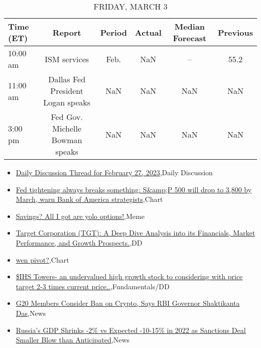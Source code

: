 \documentclass{article}%
\begin{document}
\begin{table}[htbp]%
\caption{FRIDAY, MARCH 3}%
\centering%
\begin{adjustbox}{width=1\textwidth}%
\begin{tabular}{lccccc}
\toprule
Time (ET) &                            Report & Period & Actual & Median Forecast & Previous \\
\midrule
 10:00 am &                      ISM services &   Feb. &    NaN &              -- &     55.2 \\
 11:00 am & Dallas Fed President Logan speaks &    NaN &    NaN &             NaN &      NaN \\
  3:00 pm &   Fed Gov. Michelle Bowman speaks &    NaN &    NaN &             NaN &      NaN \\
\bottomrule
\end{tabular}
%
\end{adjustbox}%
\end{table}

%
\begin{itemize}%
\item%
\href{https://reddit.com/r/wallstreetbets/comments/11d95qb/daily\_discussion\_thread\_for\_february\_27\_2023/}{Daily Discussion Thread for February 27, 2023},Daily Discussion%
\item%
\href{https://reddit.com/r/wallstreetbets/comments/11d91pj/fed\_tightening\_always\_breaks\_something\_sp\_500/}{Fed tightening always breaks something: S\&amp;P 500 will drop to 3,800 by March, warn Bank of America strategists},Chart%
\item%
\href{https://reddit.com/r/wallstreetbets/comments/11d7mxk/savings\_all\_i\_got\_are\_yolo\_options/}{Savings? All I got are yolo options!},Meme%
\item%
\href{https://reddit.com/r/wallstreetbets/comments/11d6a3s/target\_corporation\_tgt\_a\_deep\_dive\_analysis\_into/}{Target Corporation (TGT): A Deep Dive Analysis into its Financials, Market Performance, and Growth Prospects.},DD%
\item%
\href{https://reddit.com/r/wallstreetbets/comments/11d5p6j/wen\_pivot/}{wen pivot?},Chart%
\item%
\href{https://reddit.com/r/StockMarket/comments/11d2taj/ihs\_towers\_an\_undervalued\_high\_growth\_stock\_to/}{\$IHS Towers- an undervalued high growth stock to considering with price target 2-3 times current price..},Fundamentals/DD%
\item%
\href{https://reddit.com/r/Economics/comments/11d2xv1/g20\_members\_consider\_ban\_on\_crypto\_says\_rbi/}{G20 Members Consider Ban on Crypto, Says RBI Governor Shaktikanta Das},News%
\item%
\href{https://reddit.com/r/Economics/comments/11czvib/russias\_gdp\_shrinks\_2\_vs\_expected\_1015\_in\_2022\_as/}{Russia's GDP Shrinks -2\% vs Expected -10-15\% in 2022 as Sanctions Deal Smaller Blow than Anticipated},News%
\end{itemize}%
\end{document}
